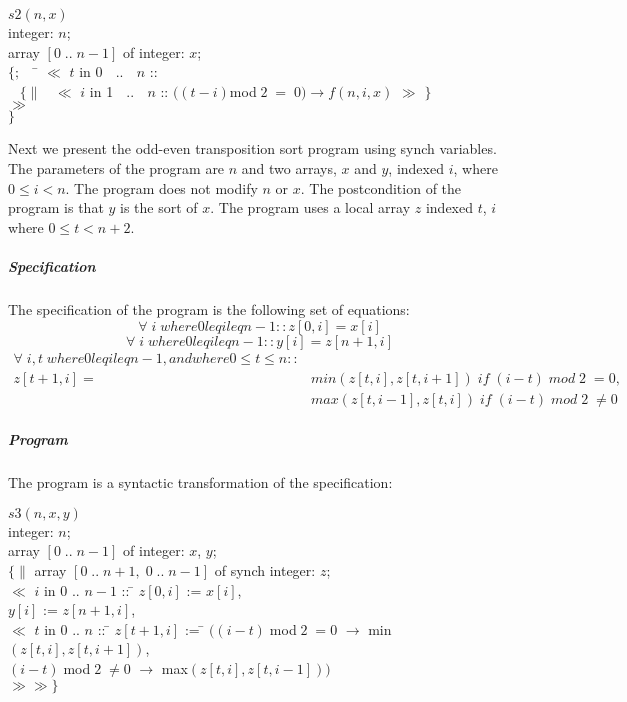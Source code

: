 \begin{tabbing}
$s2(n,x)$ \\
integer: $n$; \\
array $[0 \; .. \; n-1]$ of integer: $x$; \\
$\{;$
$\; \;$  \= $\ll$ $t$ in  0 $\;$ .. $\;$ $n$ :: \\
$ \; \; \; \{\| \; \; $  $\ll$ $i$ in  1 $\;$ .. $\;$ $n$ ::
$((t-i) $mod$ \; 2 \;= \;0) \rightarrow f(n,i,x)$ $\gg$ $\}$ \\
\> $\gg$ \\
$\}$
\end{tabbing}


Next we present the odd-even transposition sort program using 
synch variables.  
The parameters of the program are $n$ and two arrays, $x$ and $y$, indexed $i$, 
where $0 \leq i < n$. 
The program does not modify $n$ or $x$.
The postcondition of the program is that $y$ is the sort of $x$.
The program uses a local array $z$ indexed $t$, $i$ where $0 \leq t < n+2$.

\subparagraph{Specification}
The specification of the program
is the following set of equations:\\
\[ \forall \; i \; where 0 leq i leq n-1 :: z[0,i] = x[i] \]
\[ \forall \; i \; where 0 leq i leq n-1 :: y[i] = z[n+1,i]\]
\begin{eqnarray*}
\forall \; i,t \; where 0 leq i leq n-1, and where 0 \leq t \leq n :: \\
z[t+1,i] = & min(z[t,i],z[t,i+1]) \; if \; (i-t)\; mod \; 2 \; = 0, \\
         & max(z[t,i-1],z[t,i]) \; if \; (i-t) \; mod \; 2 \; \not = 0
\end{eqnarray*}       

\subparagraph{Program}
The program is a syntactic transformation of the specification:
\begin{tabbing}
$s3(n,x,y)$\\
integer: $n$; \\
array $[0 \; .. \; n-1]$ of integer: $x$, $y$;\\
$\{\|$ array $[0 \;  .. \; n+1, \; 0 \; .. \; n-1]$ of synch integer: $z$;  \\
  $\ll$ $i$ in $0$ .. $n-1$ :: \= $z[0,i]$ := $x[i]$, \\
\> $y[i]$ := $z[n+1,i]$, \\
      $\ll$ $t$ in $0$ .. $n$ :: \=
$z[t+1,i]$ := \=  $((i-t)\; $mod$ \; 2 \; = 0$ $\rightarrow$ 
min$(z[t,i],z[t,i+1])$,\\
\> \> $(i-t) \; $mod$ \; 2 \; \not = 0$ $\rightarrow$ max$(z[t,i],z[t,i-1]))$ \\
  $\gg \gg \}$
\end{tabbing}
